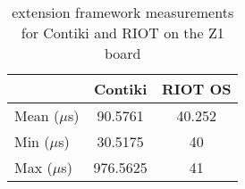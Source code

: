 \begin{table}[!ht]
  \centering
  \begin{tabular}{l|c|c}
                & Contiki  & RIOT OS \\ \hline
  Mean ($\mu$s) & 90.5761  & 40.252      \\
  Min  ($\mu$s) & 30.5175  & 40      \\
  Max  ($\mu$s) & 976.5625 & 41     
  \end{tabular}
  \caption{extension framework measurements for Contiki and RIOT on the Z1 board}
  \label{tab:extension-framework-z1}
  \end{table}
